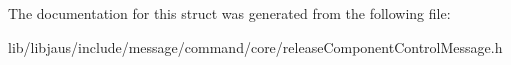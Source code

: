 \-The documentation for this struct was generated from the following file\-:\begin{DoxyCompactItemize}
\item 
lib/libjaus/include/message/command/core/release\-Component\-Control\-Message.\-h\end{DoxyCompactItemize}
